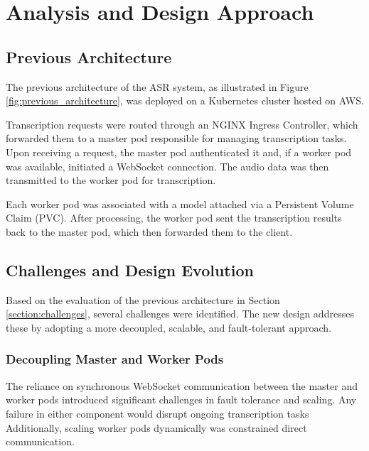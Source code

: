 \chapter{Analysis and Design Approach} \label{chapter:analysis_and_design}
\section{Previous Architecture}
The previous architecture of the ASR system, as illustrated in Figure \ref{fig:previous_architecture}, was deployed on a Kubernetes cluster hosted on AWS.

Transcription requests were routed through an NGINX Ingress Controller, which forwarded them to a master pod responsible for managing transcription tasks. Upon receiving a request, the master pod authenticated it and, if a worker pod was available, initiated a WebSocket connection. The audio data was then transmitted to the worker pod for transcription.

Each worker pod was associated with a model attached via a Persistent Volume Claim (PVC). After processing, the worker pod sent the transcription results back to the master pod, which then forwarded them to the client.

\section{Challenges and Design Evolution}
Based on the evaluation of the previous architecture in Section \ref{section:challenges}, several challenges were identified. The new design addresses these by adopting a more decoupled, scalable, and fault-tolerant approach.

\subsection{Decoupling Master and Worker Pods}
The reliance on synchronous WebSocket communication between the master and worker pods introduced significant challenges in fault tolerance and scaling. Any failure in either component would disrupt ongoing transcription tasks Additionally, scaling worker pods dynamically was constrained direct communication.

